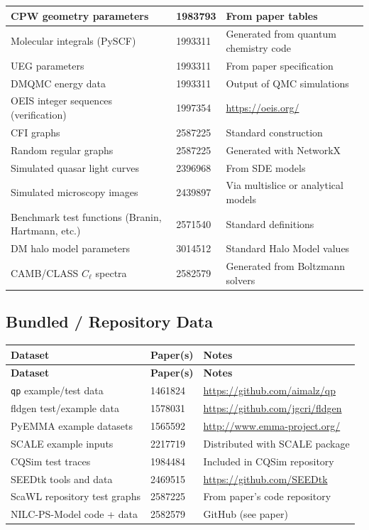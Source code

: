 \documentclass[11pt,a4paper]{article}
\begin{document}
\begin{longtable}{p{5cm} p{3cm} p{6cm}}
\midrule
CPW geometry parameters & 1983793 & From paper tables \\
\midrule
Molecular integrals (PySCF) & 1993311 & Generated from quantum chemistry code \\
\midrule
UEG parameters & 1993311 & From paper specification \\
\midrule
DMQMC energy data & 1993311 & Output of QMC simulations \\
\midrule
OEIS integer sequences (verification) & 1997354 & \url{https://oeis.org/} \\
\midrule
CFI graphs & 2587225 & Standard construction \\
\midrule
Random regular graphs & 2587225 & Generated with NetworkX \\
\midrule
Simulated quasar light curves & 2396968 & From SDE models \\
\midrule
Simulated microscopy images & 2439897 & Via multislice or analytical models \\
\midrule
Benchmark test functions (Branin, Hartmann, etc.) & 2571540 & Standard definitions \\
\midrule
DM halo model parameters & 3014512 & Standard Halo Model values \\
\midrule
CAMB/CLASS $C_\ell$ spectra & 2582579 & Generated from Boltzmann solvers \\
\bottomrule
\end{longtable}


\subsection{Bundled / Repository Data}

\begin{longtable}{p{5cm} p{3cm} p{6cm}}
\toprule
\textbf{Dataset} & \textbf{Paper(s)} & \textbf{Notes} \\
\midrule
\endfirsthead
\toprule
\textbf{Dataset} & \textbf{Paper(s)} & \textbf{Notes} \\
\midrule
\endhead
\texttt{qp} example/test data & 1461824 & \url{https://github.com/aimalz/qp} \\
\midrule
fldgen test/example data & 1578031 & \url{https://github.com/jgcri/fldgen} \\
\midrule
PyEMMA example datasets & 1565592 & \url{http://www.emma-project.org/} \\
\midrule
SCALE example inputs & 2217719 & Distributed with SCALE package \\
\midrule
CQSim test traces & 1984484 & Included in CQSim repository \\
\midrule
SEEDtk tools and data & 2469515 & \url{https://github.com/SEEDtk} \\
\midrule
ScaWL repository test graphs & 2587225 & From paper's code repository \\
\midrule
NILC-PS-Model code + data & 2582579 & GitHub (see paper) \\
\bottomrule
\end{longtable}
\end{document}
